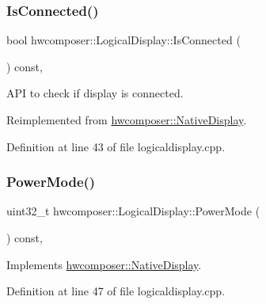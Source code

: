 \subsubsection{\texorpdfstring{Is\+Connected()}{IsConnected()}}
{\footnotesize\ttfamily bool hwcomposer\+::\+Logical\+Display\+::\+Is\+Connected (\begin{DoxyParamCaption}{ }\end{DoxyParamCaption}) const\hspace{0.3cm}{\ttfamily [override]}, {\ttfamily [virtual]}}

A\+PI to check if display is connected. 

Reimplemented from \mbox{\hyperlink{classhwcomposer_1_1NativeDisplay_af22694b3396866fd4f003755f4951b18}{hwcomposer\+::\+Native\+Display}}.



Definition at line 43 of file logicaldisplay.\+cpp.


\begin{DoxyCode}{0}
\end{DoxyCode}
\mbox{\label{classhwcomposer_1_1LogicalDisplay_af0fd1b1d9b574403e9c4680f7b371c21}} 
\subsubsection{\texorpdfstring{Power\+Mode()}{PowerMode()}}
{\footnotesize\ttfamily uint32\+\_\+t hwcomposer\+::\+Logical\+Display\+::\+Power\+Mode (\begin{DoxyParamCaption}{ }\end{DoxyParamCaption}) const\hspace{0.3cm}{\ttfamily [override]}, {\ttfamily [virtual]}}



Implements \mbox{\hyperlink{classhwcomposer_1_1NativeDisplay_af03b22112e421559c5f59837a2209716}{hwcomposer\+::\+Native\+Display}}.



Definition at line 47 of file logicaldisplay.\+cpp.


